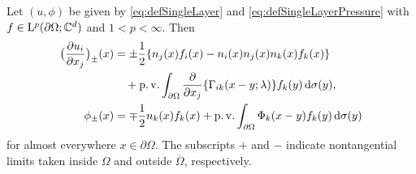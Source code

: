 \begin{lem}
  \label{lem:traceFormulas}
  Let $(u,\phi)$ be given by \eqref{eq:defSingleLayer} and \eqref{eq:defSingleLayerPressure} with $f \in \mathrm{L}^p(\partial\Omega; \mathbb{C}^d)$ and $1 < p < \infty$.
  Then
  \begin{align}
    \big( \frac{\partial u_i}{\partial x_j} \big)_{\pm}(x) 
    &= \pm \frac{1}{2} \{ n_j(x) f_i(x) - n_i(x) n_j(x) n_k(x) f_k(x) \} \nonumber\\
    &\quad+ \operatorname{p. v.} \int_{\partial\Omega} \frac{\partial}{\partial x_j} \{ \Gamma_{ik} (x - y; \lambda) \} f_k(y) \, {\operatorname{d}\!{\sigma}}(y), \label{eq:traceFormula} \\
    \phi_\pm(x) &= \mp \frac{1}{2} n_k(x) f_k(x) + \operatorname{p. v.}\int_{\partial\Omega} \Phi_k(x - y) f_k(y) \, {\operatorname{d}\!{\sigma}}(y) \nonumber
  \end{align}
  for almost everywhere $x \in \partial\Omega$.
  The subscripts $+$ and $-$ indicate nontangential limits taken inside $\Omega$ and outside $\overline\Omega$, respectively.
\end{lem}

